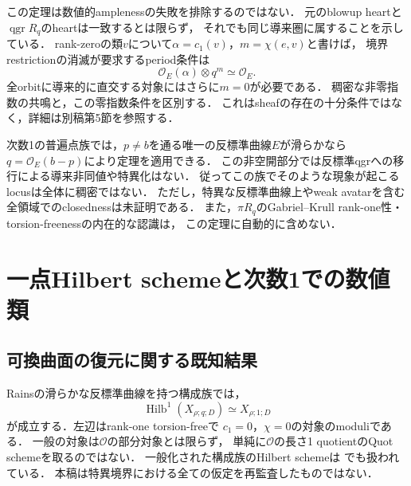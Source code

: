\documentclass[11pt,a4paper]{ltjsarticle}
\theoremstyle{definition}
\newcommand{\OO}{\mathcal O}
\newcommand{\qgr}{\operatorname{qgr}}
\newcommand{\Hilb}{\operatorname{Hilb}}
\begin{document}
この定理は数値的amplenessの失敗を排除するのではない．
元のblowup heartと$\qgr R_q$のheartは一致するとは限らず，
それでも同じ導来圏に属することを示している．
rank-zeroの類$v$について$\alpha=c_1(v)$，$m=\chi(e,v)$と書けば，
境界restrictionの消滅が要求するperiod条件は
\[
 \OO_E(\alpha)\otimes q^m\simeq\OO_E.
\]
全orbitに導来的に直交する対象にはさらに$m=0$が必要である．
稠密な非零指数の共鳴と，この零指数条件を区別する．
これはsheafの存在の十分条件ではなく，詳細は別稿第5節を参照する．

次数1の普遍点族では，$p\ne b$を通る唯一の反標準曲線$E$が滑らかなら
$q=\OO_E(b-p)$により定理を適用できる．
この非空開部分では反標準qgrへの移行による導来非同値や特異化はない．
従ってこの族でそのような現象が起こるlocusは全体に稠密ではない．
ただし，特異な反標準曲線上やweak avatarを含む全領域でのclosednessは未証明である．
また，$\pi R_q$のGabriel--Krull rank-one性・torsion-freenessの内在的な認識は，
この定理に自動的に含めない．


\section{一点Hilbert schemeと次数1での数値類}
\subsection{可換曲面の復元に関する既知結果}
Rains\cite[Proposition 11.48]{RainsElliptic}の滑らかな反標準曲線を持つ構成族では，
\begin{equation}\label{eq:hilb1}
 \Hilb^1(X_{\rho;q;D})\simeq X_{\rho;1;D}
\end{equation}
が成立する．左辺はrank-one torsion-freeで
$c_1=0$，$\chi=0$の対象のmoduliである．
一般の対象は$\OO$の部分対象とは限らず，
単純に$\OO$の長さ1 quotientのQuot schemeを取るのではない．
一般化された構成族のHilbert schemeは
\cite[Theorem 10.26とその直後]{RainsBirational}でも扱われている．
本稿は特異境界における全ての仮定を再監査したものではない．
\end{document}
